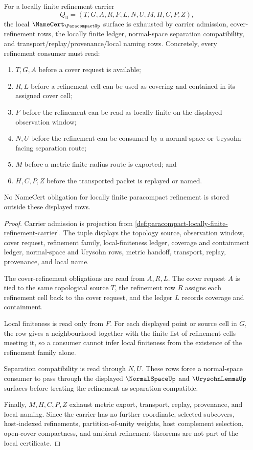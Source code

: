 \begin{theorem}
\label{thm:paracompact-refinement-namecert-obligations}
For a locally finite refinement carrier
$$
Q_{\mathrm{lf}}=(T,G,A,R,F,L,N,U,M,H,C,P,Z),
$$
the local $\NameCert_{\ParacompactUp}$ surface is exhausted by carrier admission, cover-refinement rows, the locally finite ledger, normal-space separation compatibility, and transport/replay/provenance/local naming rows.
Concretely, every refinement consumer must read:
\begin{enumerate}
\item $T,G,A$ before a cover request is available;
\item $R,L$ before a refinement cell can be used as covering and contained in its assigned cover cell;
\item $F$ before the refinement can be read as locally finite on the displayed observation window;
\item $N,U$ before the refinement can be consumed by a normal-space or Urysohn-facing separation route;
\item $M$ before a metric finite-radius route is exported; and
\item $H,C,P,Z$ before the transported packet is replayed or named.
\end{enumerate}
No NameCert obligation for locally finite paracompact refinement is stored outside these displayed rows.
\end{theorem}
\begin{proof}
Carrier admission is projection from \autoref{def:paracompact-locally-finite-refinement-carrier}. The tuple displays the topology source, observation window, cover request, refinement family, local-finiteness ledger, coverage and containment ledger, normal-space and Urysohn rows, metric handoff, transport, replay, provenance, and local name.

The cover-refinement obligations are read from $A,R,L$. The cover request $A$ is tied to the same topological source $T$, the refinement row $R$ assigns each refinement cell back to the cover request, and the ledger $L$ records coverage and containment.

Local finiteness is read only from $F$. For each displayed point or source cell in $G$, the row gives a neighbourhood together with the finite list of refinement cells meeting it, so a consumer cannot infer local finiteness from the existence of the refinement family alone.

Separation compatibility is read through $N,U$. These rows force a normal-space consumer to pass through the displayed $\NormalSpaceUp$ and $\UrysohnLemmaUp$ surfaces before treating the refinement as separation-compatible.

Finally, $M,H,C,P,Z$ exhaust metric export, transport, replay, provenance, and local naming. Since the carrier has no further coordinate, selected subcovers, host-indexed refinements, partition-of-unity weights, host complement selection, open-cover compactness, and ambient refinement theorems are not part of the local certificate.
\end{proof}


